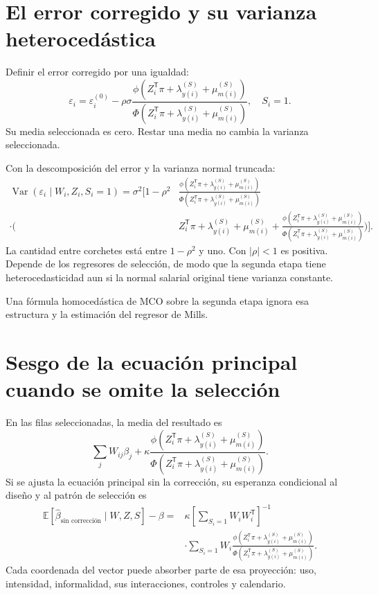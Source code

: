 \documentclass[11pt,a4paper]{article}
\newcommand{\E}{\mathbb E}
\newcommand{\abs}[1]{\left\lvert #1\right\rvert}
\DeclareMathOperator{\Var}{Var}
\begin{document}
\clearpage
\section{El error corregido y su varianza heterocedástica}

Definir el error corregido por una igualdad:
\[
\varepsilon_i=
\varepsilon_i^{(0)}
-\rho\sigma\frac{\phi(Z_i^{\mathsf T}\pi+\lambda_{y(i)}^{(S)}+\mu_{m(i)}^{(S)})}
{\Phi(Z_i^{\mathsf T}\pi+\lambda_{y(i)}^{(S)}+\mu_{m(i)}^{(S)})},
\quad S_i=1.
\]
Su media seleccionada es cero. Restar una media no cambia la varianza seleccionada.

Con la descomposición del error y la varianza normal truncada:
\[
\begin{aligned}
\Var(\varepsilon_i\mid W_i,Z_i,S_i=1)
=\sigma^2\Bigg[1-\rho^2&
\frac{\phi(Z_i^{\mathsf T}\pi+\lambda_{y(i)}^{(S)}+\mu_{m(i)}^{(S)})}
{\Phi(Z_i^{\mathsf T}\pi+\lambda_{y(i)}^{(S)}+\mu_{m(i)}^{(S)})}\\
\cdot\Bigg(&Z_i^{\mathsf T}\pi+\lambda_{y(i)}^{(S)}+\mu_{m(i)}^{(S)}
+\frac{\phi(Z_i^{\mathsf T}\pi+\lambda_{y(i)}^{(S)}+\mu_{m(i)}^{(S)})}
{\Phi(Z_i^{\mathsf T}\pi+\lambda_{y(i)}^{(S)}+\mu_{m(i)}^{(S)})}\Bigg)\Bigg].
\end{aligned}
\]
La cantidad entre corchetes está entre $1-\rho^2$ y uno. Con $\abs\rho<1$ es positiva. Depende de los regresores de selección, de modo que la segunda etapa tiene heterocedasticidad aun si la normal salarial original tiene varianza constante.

Una fórmula homocedástica de MCO sobre la segunda etapa ignora esa estructura y la estimación del regresor de Mills.

\clearpage
\section{Sesgo de la ecuación principal cuando se omite la selección}

En las filas seleccionadas, la media del resultado es
\[
\sum_jW_{ij}\beta_j+
\kappa\frac{\phi(Z_i^{\mathsf T}\pi+\lambda_{y(i)}^{(S)}+\mu_{m(i)}^{(S)})}
{\Phi(Z_i^{\mathsf T}\pi+\lambda_{y(i)}^{(S)}+\mu_{m(i)}^{(S)})}.
\]
Si se ajusta la ecuación principal sin la corrección, su esperanza condicional al diseño y al patrón de selección es
\[
\begin{aligned}
\E[\widehat\beta_{\text{sin corrección}}\mid W,Z,S]-\beta
={}&\kappa\left[\sum_{S_i=1}W_iW_i^{\mathsf T}\right]^{-1}\\
&\cdot\sum_{S_i=1}W_i
\frac{\phi(Z_i^{\mathsf T}\pi+\lambda_{y(i)}^{(S)}+\mu_{m(i)}^{(S)})}
{\Phi(Z_i^{\mathsf T}\pi+\lambda_{y(i)}^{(S)}+\mu_{m(i)}^{(S)})}.
\end{aligned}
\]
Cada coordenada del vector puede absorber parte de esa proyección: uso, intensidad, informalidad, sus interacciones, controles y calendario.
\end{document}
